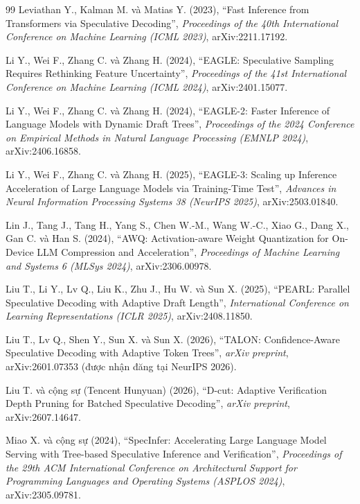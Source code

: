 \begin{thebibliography}{99}
Leviathan Y., Kalman M. và Matias Y. (2023),
``Fast Inference from Transformers via Speculative Decoding'',
\textit{Proceedings of the 40th International Conference on Machine Learning (ICML 2023)},
arXiv:2211.17192.

Li Y., Wei F., Zhang C. và Zhang H. (2024),
``EAGLE: Speculative Sampling Requires Rethinking Feature Uncertainty'',
\textit{Proceedings of the 41st International Conference on Machine Learning (ICML 2024)},
arXiv:2401.15077.

Li Y., Wei F., Zhang C. và Zhang H. (2024),
``EAGLE-2: Faster Inference of Language Models with Dynamic Draft Trees'',
\textit{Proceedings of the 2024 Conference on Empirical Methods in Natural Language
Processing (EMNLP 2024)}, arXiv:2406.16858.

Li Y., Wei F., Zhang C. và Zhang H. (2025),
``EAGLE-3: Scaling up Inference Acceleration of Large Language Models via Training-Time Test'',
\textit{Advances in Neural Information Processing Systems 38 (NeurIPS 2025)},
arXiv:2503.01840.

Lin J., Tang J., Tang H., Yang S., Chen W.-M., Wang W.-C., Xiao G., Dang X., Gan C. và Han S. (2024),
``AWQ: Activation-aware Weight Quantization for On-Device LLM Compression and Acceleration'',
\textit{Proceedings of Machine Learning and Systems 6 (MLSys 2024)}, arXiv:2306.00978.

Liu T., Li Y., Lv Q., Liu K., Zhu J., Hu W. và Sun X. (2025),
``PEARL: Parallel Speculative Decoding with Adaptive Draft Length'',
\textit{International Conference on Learning Representations (ICLR 2025)}, arXiv:2408.11850.

Liu T., Lv Q., Shen Y., Sun X. và Sun X. (2026),
``TALON: Confidence-Aware Speculative Decoding with Adaptive Token Trees'',
\textit{arXiv preprint}, arXiv:2601.07353 (được nhận đăng tại NeurIPS 2026).

Liu T. và cộng sự (Tencent Hunyuan) (2026),
``D-cut: Adaptive Verification Depth Pruning for Batched Speculative Decoding'',
\textit{arXiv preprint}, arXiv:2607.14647.

Miao X. và cộng sự (2024),
``SpecInfer: Accelerating Large Language Model Serving with Tree-based Speculative
Inference and Verification'',
\textit{Proceedings of the 29th ACM International Conference on Architectural Support for
Programming Languages and Operating Systems (ASPLOS 2024)}, arXiv:2305.09781.


\end{thebibliography}
